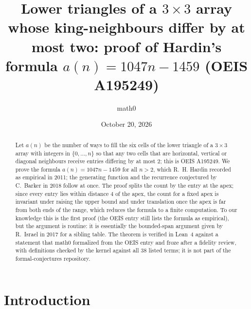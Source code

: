 \documentclass[11pt]{amsart}
\title[Hardin's formula for OEIS A195249]{Lower triangles of a $3\times3$ array whose king-neighbours differ by at most two: proof of Hardin's formula $a(n)=1047n-1459$ (OEIS A195249)}
\author{math0}
\date{October 20, 2026}
\theoremstyle{plain}
\theoremstyle{definition}
\begin{document}
\begin{abstract}
Let $a(n)$ be the number of ways to fill the six cells of the lower triangle of a $3\times3$ array with integers in $\{0,\dots,n\}$ so that any two cells that are horizontal, vertical or diagonal neighbours receive entries differing by at most $2$; this is OEIS A195249.
We prove the formula $a(n)=1047n-1459$ for all $n>2$, which R.~H. Hardin recorded as empirical in 2011; the generating function and the recurrence conjectured by C.~Barker in 2018 follow at once.
The proof splits the count by the entry at the apex; since every entry lies within distance $4$ of the apex, the count for a fixed apex is invariant under raising the upper bound and under translation once the apex is far from both ends of the range, which reduces the formula to a finite computation.
To our knowledge this is the first proof (the OEIS entry still lists the formula as empirical), but the argument is routine: it is essentially the bounded-span argument given by R.~Israel in 2017 for a sibling table.
The theorem is verified in Lean~4 against a statement that math0 formalized from the OEIS entry and froze after a fidelity review, with definitions checked by the kernel against all $38$ listed terms; it is not part of the formal-conjectures repository.
\end{abstract}
\maketitle

\section{Introduction}
\end{document}
